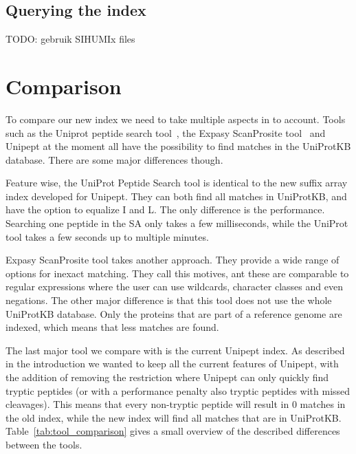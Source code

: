 \documentclass[10pt]{article}
\begin{document}
\begin{multicols}{2}
        \subsection{Querying the index}
        TODO: gebruik SIHUMIx files



        \section{Comparison}\label{sec:comparison}
        To compare our new index we need to take multiple aspects in to account.
        Tools such as the Uniprot peptide search tool~\cite{uniprot_search_site, uniprot_search_paper}, the Expasy ScanProsite tool~\cite{scanprosite} and Unipept at the moment all have the possibility to find matches in the UniProtKB database.
        There are some major differences though.

        Feature wise, the UniProt Peptide Search tool is identical to the new suffix array index developed for Unipept.
        They can both find all matches in UniProtKB, and have the option to equalize I and L\@.
        The only difference is the performance.
        Searching one peptide in the SA only takes a few milliseconds, while the UniProt tool takes a few seconds up to multiple minutes.

        Expasy ScanProsite tool takes another approach.
        They provide a wide range of options for inexact matching.
        They call this motives, ant these are comparable to regular expressions where the user can use wildcards, character classes and even negations.
        The other major difference is that this tool does not use the whole UniProtKB database.
        Only the proteins that are part of a reference genome are indexed, which means that less matches are found.

        The last major tool we compare with is the current Unipept index.
        As described in the introduction we wanted to keep all the current features of Unipept, with the addition of removing the restriction where Unipept can only quickly find tryptic peptides (or with a performance penalty also tryptic peptides with missed cleavages).
        This means that every non-tryptic peptide will result in 0 matches in the old index, while the new index will find all matches that are in UniProtKB\@.
        Table~\ref{tab:tool_comparison} gives a small overview of the described differences between the tools.


\end{multicols}
\end{document}
